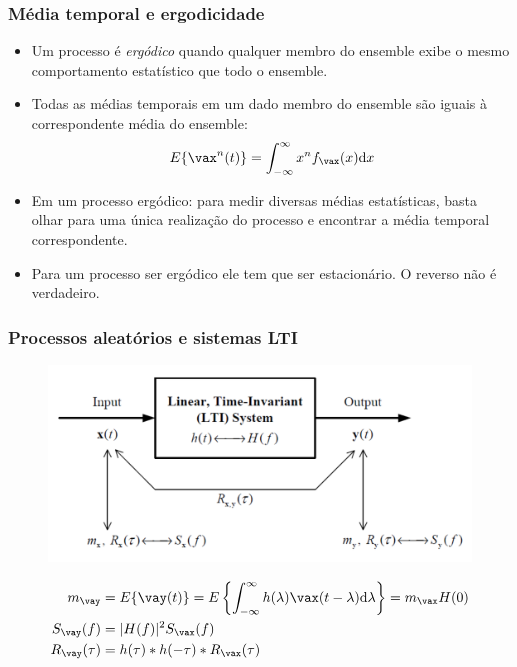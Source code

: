 \begin{frame}
    \frametitle{Média temporal e ergodicidade}

    \begin{itemize}
     \item Um processo é \textit{ergódico} quando qualquer membro do ensemble exibe o mesmo comportamento estatístico que todo o ensemble.
      \item Todas as médias temporais em um dado membro do ensemble são iguais à correspondente média do ensemble:
      \begin{equation}
	  E\{\vax^n (t) \} = \int_{-\infty}^{\infty} x^n f_{\vax}(x)\mathrm{d}x
      \end{equation}
      \item Em um processo ergódico: para medir diversas médias estatísticas, basta olhar para uma única realização do processo e encontrar a média temporal correspondente.
      \item Para um processo ser ergódico ele tem que ser estacionário. O reverso não é verdadeiro.

    \end{itemize}
          
\end{frame}

\begin{frame}
    \frametitle{Processos aleatórios e sistemas LTI}

    \begin{figure}[t]
	  \begin{center}
	    \includegraphics[width=0.7\columnwidth]{figs/fig26}
	  \end{center}
	\end{figure}
          
    \begin{align}
	  m_{\vay} &=  E\{\vay(t)\} = E\left\{ \int_{-\infty}^{\infty} h(\lambda)\vax(t-\lambda)\mathrm{d}\lambda \right\} = m_{\vax} H(0) \\
	  S_{\vay}(f) &= |H(f)|^2 S_{\vax}(f) \\
	  R_{\vay}(\tau) &= h(\tau) * h(-\tau) * R_{\vax}(\tau)
    \end{align}


\end{frame}
